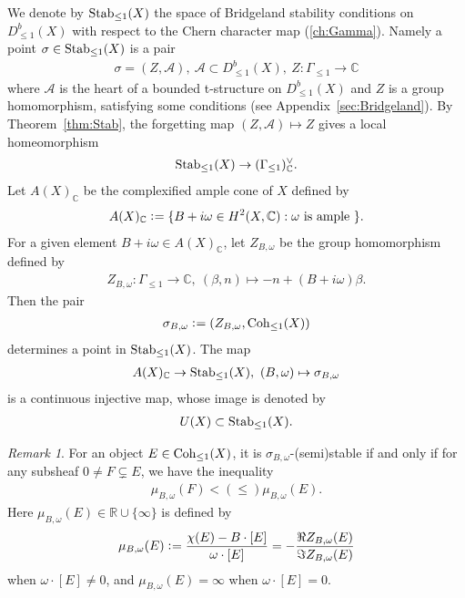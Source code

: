 \documentclass[11pt]{amsart}
\theoremstyle{plain}
\theoremstyle{definition}
\theoremstyle{remark}
\newtheorem{rmk}[thm]{Remark}
\newcommand{\aA}{\mathcal{A}}
\newcommand{\Coh}{\mathop{\rm Coh}\nolimits}
\newcommand{\Stab}{\mathop{\rm Stab}\nolimits}
\begin{document}
We denote by $\Stab_{\le 1}(X)$ the 
space of Bridgeland stability conditions on 
$D^b_{\le 1}(X)$ with respect to the 
Chern character map (\ref{ch:Gamma}). 
Namely a point $\sigma \in \Stab_{\le 1}(X)$
is a pair 
\begin{align*}
\sigma=(Z, \aA), \ 
\aA \subset D^b_{\le 1}(X), \ 
Z \colon \Gamma_{\le 1} \to \mathbb{C}
\end{align*}
where $\aA$ is the heart of a bounded t-structure on 
$D^b_{\le 1}(X)$ and $Z$
is a group homomorphism, satisfying 
some conditions (see Appendix~\ref{sec:Bridgeland}). 
By Theorem~\ref{thm:Stab}, 
the forgetting map $(Z, \aA) \mapsto Z$ gives a local 
homeomorphism 
 \begin{align*}
\Stab_{\le 1}(X) \to (\Gamma_{\le 1})_{\mathbb{C}}^{\vee}. 
\end{align*}
Let $A(X)_{\mathbb{C}}$ be the complexified ample cone of $X$
defined by
\begin{align*}
A(X)_{\mathbb{C}} \cneq \{B+i\omega \in H^2(X, \mathbb{C}) : \omega \mbox{ is ample }\}. 
\end{align*}
For a given element $B+i\omega \in A(X)_{\mathbb{C}}$, let 
$Z_{B, \omega}$ be the group homomorphism 
defined by 
\begin{align}\label{ZBw}
Z_{B, \omega} \colon \Gamma_{\le 1} \to \mathbb{C}, \ 
(\beta, n) \mapsto -n+(B+i\omega)\beta.
\end{align}
Then the pair
\begin{align}\label{sigma:Bw}
\sigma_{B, \omega} \cneq (Z_{B, \omega}, \Coh_{\le 1}(X))
\end{align}
determines a point in $\Stab_{\le 1}(X)$. 
The map 
\begin{align*}
A(X)_{\mathbb{C}} \to \Stab_{\le 1}(X),  \ 
(B, \omega) \mapsto \sigma_{B, \omega}
\end{align*}
is a continuous injective 
map, whose image is denoted by 
\begin{align*}
U(X) \subset \Stab_{\le 1}(X).
\end{align*}  

\begin{rmk}
For an object $E \in \Coh_{\le 1}(X)$, it is 
$\sigma_{B, \omega}$-(semi)stable if and only if for any subsheaf 
$0 \neq F \subsetneq E$, we have the inequality
\begin{align*}
\mu_{B, \omega}(F)<(\le) \mu_{B, \omega}(E).
\end{align*}
Here $\mu_{B, \omega}(E) \in \mathbb{R} \cup \{\infty\}$ is defined by 
\begin{align}\label{mu:slope}
\mu_{B, \omega}(E) \cneq 
\frac{\chi(E)-B \cdot [E]}{\omega \cdot [E]}
=-\frac{\Re Z_{B, \omega}(E)}{\Im Z_{B, \omega}(E)} 
\end{align}
when $\omega \cdot [E] \neq 0$, 
and $\mu_{B, \omega}(E)=\infty$
when $\omega \cdot [E]=0$. 
\end{rmk}
\end{document}
